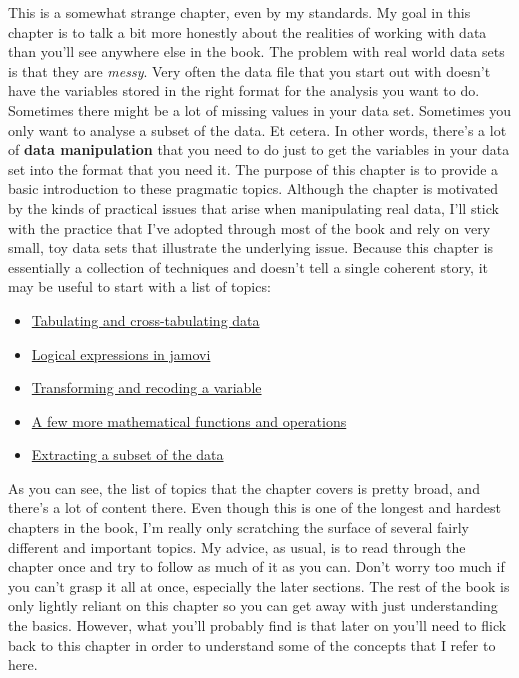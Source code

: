 \documentclass[
]{book}
\providecommand{\tightlist}{%
  \setlength{\itemsep}{0pt}\setlength{\parskip}{0pt}}
\begin{document}
This is a somewhat strange chapter, even by my standards. My goal in this chapter is to talk a bit more honestly about the realities of working with data than you'll see anywhere else in the book. The problem with real world data sets is that they are \emph{messy}. Very often the data file that you start out with doesn't have the variables stored in the right format for the analysis you want to do. Sometimes there might be a lot of missing values in your data set. Sometimes you only want to analyse a subset of the data. Et cetera. In other words, there's a lot of \textbf{data manipulation} that you need to do just to get the variables in your data set into the format that you need it. The purpose of this chapter is to provide a basic introduction to these pragmatic topics. Although the chapter is motivated by the kinds of practical issues that arise when manipulating real data, I'll stick with the practice that I've adopted through most of the book and rely on very small, toy data sets that illustrate the underlying issue. Because this chapter is essentially a collection of techniques and doesn't tell a single coherent story, it may be useful to start with a list of topics:

\begin{itemize}
\tightlist
\item
  \protect\hyperlink{tabulating-and-cross-tabulating-data}{Tabulating and cross-tabulating data}
\item
  \protect\hyperlink{logical-expressions-in-jamovi}{Logical expressions in jamovi}
\item
  \protect\hyperlink{transforming-and-recoding-a-variable}{Transforming and recoding a variable}
\item
  \protect\hyperlink{a-few-more-mathematical-functions-and-operations}{A few more mathematical functions and operations}
\item
  \protect\hyperlink{extracting-a-subset-of-the-data}{Extracting a subset of the data}
\end{itemize}

As you can see, the list of topics that the chapter covers is pretty broad, and there's a lot of content there. Even though this is one of the longest and hardest chapters in the book, I'm really only scratching the surface of several fairly different and important topics. My advice, as usual, is to read through the chapter once and try to follow as much of it as you can. Don't worry too much if you can't grasp it all at once, especially the later sections. The rest of the book is only lightly reliant on this chapter so you can get away with just understanding the basics. However, what you'll probably find is that later on you'll need to flick back to this chapter in order to understand some of the concepts that I refer to here.
\end{document}
